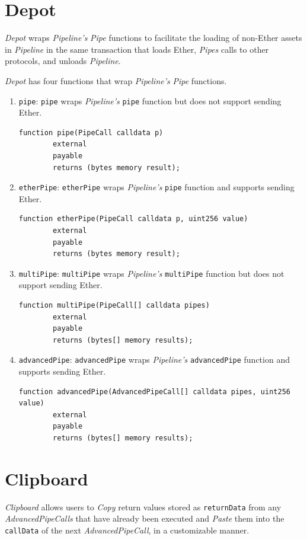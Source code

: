 \documentclass[tikz]{article}
\newcommand{\code}[1]{\texttt{#1}}
\newcommand{\term}[1]{\textsl{#1}}
\begin{document}
\newpage
\section{Depot}
\term{Depot} wraps \term{Pipeline's} \term{Pipe} functions to facilitate the loading of non-Ether assets in \term{Pipeline} in the same transaction that loads Ether, \term{Pipes} calls to other protocols, and unloads \term{Pipeline}.

\term{Depot} has four functions that wrap \term{Pipeline's} \term{Pipe} functions.

\begin{enumerate}
    \item \code{pipe}: \code{pipe} wraps \term{Pipeline's} \code{pipe} function but does not support sending Ether.
    \begin{lstlisting}[language=Solidity]
    function pipe(PipeCall calldata p)
        external
        payable
        returns (bytes memory result);
    \end{lstlisting}
    \item \code{etherPipe}: \code{etherPipe} wraps \term{Pipeline's} \code{pipe} function and supports sending Ether.
    \begin{lstlisting}[language=Solidity]
    function etherPipe(PipeCall calldata p, uint256 value)
        external
        payable
        returns (bytes memory result);
    \end{lstlisting}
    \item \code{multiPipe}: \code{multiPipe} wraps \term{Pipeline's} \code{multiPipe} function but does not support sending Ether.
    \begin{lstlisting}[language=Solidity]
    function multiPipe(PipeCall[] calldata pipes)
        external
        payable
        returns (bytes[] memory results);
    \end{lstlisting}
    \item \code{advancedPipe}: \code{advancedPipe} wraps \term{Pipeline's} \code{advancedPipe} function and supports sending Ether.
    \begin{lstlisting}[language=Solidity]
    function advancedPipe(AdvancedPipeCall[] calldata pipes, uint256 value)
        external
        payable
        returns (bytes[] memory results);
    \end{lstlisting}
\end{enumerate}

\section{Clipboard}
\term{Clipboard} allows users to \term{Copy} return values stored as \code{returnData} from any \term{AdvancedPipeCalls} that have already been executed and \term{Paste} them into the \code{callData} of the next \term{AdvancedPipeCall}, in a customizable manner. 
\end{document}
